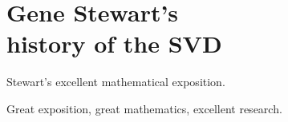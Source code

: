 \chapter[Gene Stewart's history of the SVD]{Gene Stewart's\\ history of the SVD}

Stewart's excellent mathematical exposition.

Great exposition, great mathematics, excellent research.



\endinput